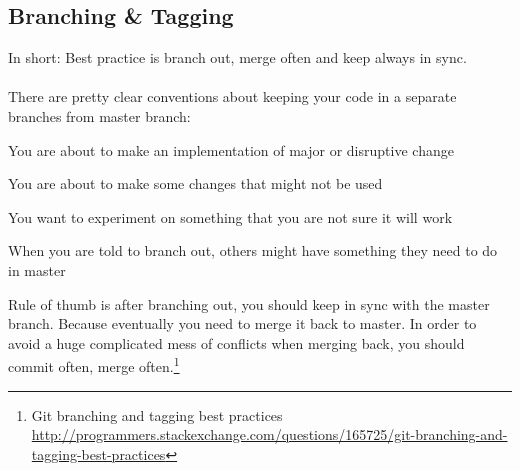 
\newpage
\subsection{Branching \& Tagging}

In short: Best practice is branch out, merge often and keep
always in sync.\\
\\
\noindent There are pretty clear conventions about keeping your
code in a separate branches from master branch:

\begin{enumerate*}
\item You are about to make an implementation of major or
disruptive change
\item You are about to make some changes that might not be used
\item You want to experiment on something that you are not sure
    it will work
\item When you are told to branch out, others might have
    something they need to do in master
\end{enumerate*}

\noindent Rule of thumb is after branching out, you should keep in sync with
the master branch. Because eventually you need to merge it back to master. In
order to avoid a huge complicated mess of conflicts when merging back, you
should commit often, merge often.\footnote{Git branching and tagging best
practices\\
\href{http://programmers.stackexchange.com/questions/165725/git-branching-and-tagging-best-practices}{http://programmers.stackexchange.com/questions/165725/git-branching-and-tagging-best-practices}}
